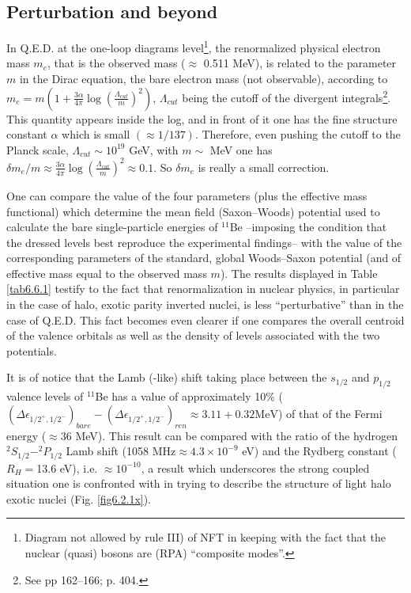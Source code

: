\subsection{Perturbation and beyond}\label{S6.6}
In Q.E.D. at the one-loop diagrams level\footnote{Diagram not allowed by rule III) of NFT in keeping with the fact that the nuclear (quasi) bosons are (RPA) ``composite modes''.}, the renormalized physical electron mass $m_e$,  that is the observed  mass ($\approx$ 0.511 MeV), is related to the  parameter $m$ in the Dirac equation, the bare electron mass (not observable), according to $m_e=m\left(1+\frac{3\alpha}{4\pi}\log\left(\frac{\Lambda_{cut}}{m}\right)^2\right)$, $\Lambda_{cut}$ being the cutoff of the divergent integrals\footnote{See \cite{Bjorken:98} pp 162--166; \cite{Milloni:94} p. 404.}. This quantity appears inside the log, and in front of it one has the fine structure constant $\alpha$ which is small $(\approx1/137)$. Therefore, even pushing the cutoff to the Planck scale, $\Lambda_{cut}\sim10^{19}$ GeV, with $m\sim$ MeV one has $\delta m_e/m\approx\frac{3\alpha}{4\pi}\log\left(\frac{\Lambda_{cut}}{m}\right)^2\approx 0.1.$ So $\delta m_e$ is really a small correction. 

One can compare the value of the four parameters (plus the effective mass functional) which determine the mean field (Saxon--Woods) potential used to calculate the bare single-particle energies of $^{11}$Be --imposing the condition that the dressed levels  best reproduce the experimental findings-- with the value of the corresponding parameters of the standard, global Woods--Saxon potential (and of effective mass equal to the observed mass $m$). The results displayed in Table \ref{tab6.6.1} testify to the fact that renormalization in nuclear physics, in particular in the case of halo, exotic parity inverted nuclei, is less ``perturbative'' than in the case of Q.E.D. This fact becomes even clearer if one compares the overall centroid of the valence orbitals as well as the density of levels associated with the two potentials.  

It is of notice that the Lamb (-like) shift taking place between the $s_{1/2}$ and $p_{1/2}$ valence levels of $^{11}$Be has a value of approximately 10\% ($(\Delta\epsilon_{1/2^+,1/2^-})_{bare}-(\Delta\epsilon_{1/2^+,1/2^-})_{ren}\approx3.11+0.32\text{MeV}$) of that of the Fermi energy ($\approx36$ MeV). This result can be compared with the ratio of the hydrogen $^2S_{1/2}-^2P_{1/2}$ Lamb shift (1058 MHz$\approx4.3\times10^{-9}$ eV) and the Rydberg constant ($R_H=$13.6 eV), i.e. $\approx10^{-10}$, a result which underscores the strong coupled situation one is confronted with in trying to describe the structure of light halo exotic nuclei (Fig. \ref{fig6.2.1x}).

